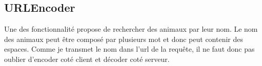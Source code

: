 \documentclass{article}
\begin{document}
\subsection{URLEncoder}
Une des fonctionnalité propose de rechercher des animaux par leur nom. Le nom des animaux peut être composé par plusieurs mot et donc peut contenir des espaces. Comme je transmet le nom dans l'url de la requête, il ne faut donc pas oublier d'encoder coté client et décoder coté serveur.
  
\end{document}
